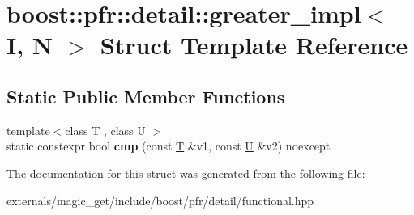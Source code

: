 \hypertarget{structboost_1_1pfr_1_1detail_1_1greater__impl}{}\section{boost\+:\+:pfr\+:\+:detail\+:\+:greater\+\_\+impl$<$ I, N $>$ Struct Template Reference}
\label{structboost_1_1pfr_1_1detail_1_1greater__impl}
\subsection*{Static Public Member Functions}
\begin{DoxyCompactItemize}
\item 
\mbox{\label{structboost_1_1pfr_1_1detail_1_1greater__impl_ad36dd38036f33a7822ed685cd833b3b7}} 
{\footnotesize template$<$class T , class U $>$ }\\static constexpr bool {\bfseries cmp} (const \mbox{\hyperlink{struct_t}{T}} \&v1, const \mbox{\hyperlink{union_u}{U}} \&v2) noexcept
\end{DoxyCompactItemize}


The documentation for this struct was generated from the following file\+:\begin{DoxyCompactItemize}
\item 
externals/magic\+\_\+get/include/boost/pfr/detail/functional.\+hpp\end{DoxyCompactItemize}
